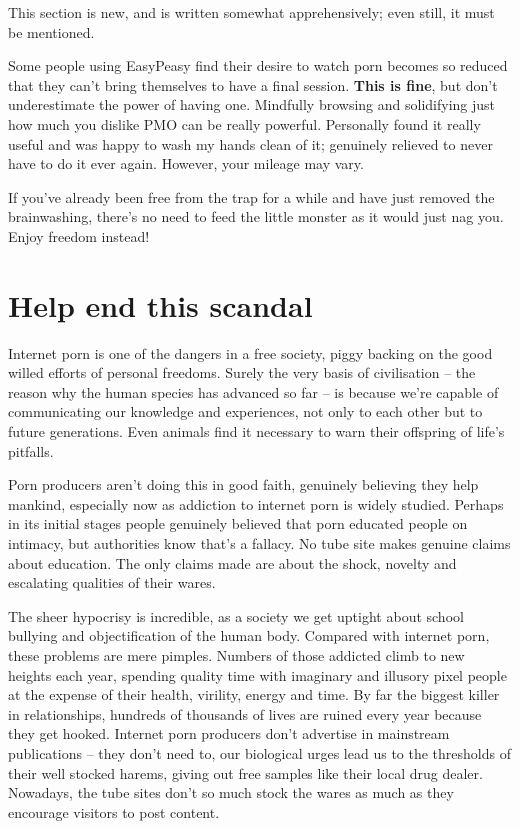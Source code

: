 \documentclass[
]{book}
\begin{document}
This section is new, and is written somewhat apprehensively; even still, it must be mentioned.

Some people using EasyPeasy find their desire to watch porn becomes so reduced that they can't bring themselves to have a final session. \textbf{This is fine}, but don't underestimate the power of having one. Mindfully browsing and solidifying just how much you dislike PMO can be really powerful. Personally found it really useful and was happy to wash my hands clean of it; genuinely relieved to never have to do it ever again. However, your mileage may vary.

If you've already been free from the trap for a while and have just removed the brainwashing, there's no need to feed the little monster as it would just nag you. Enjoy freedom instead!

\hypertarget{help-end-this-scandal}{%
\section{Help end this scandal}\label{help-end-this-scandal}}

Internet porn is one of the dangers in a free society, piggy backing on the good willed efforts of personal freedoms. Surely the very basis of civilisation -- the reason why the human species has advanced so far -- is because we're capable of communicating our knowledge and experiences, not only to each other but to future generations. Even animals find it necessary to warn their offspring of life's pitfalls.

Porn producers aren't doing this in good faith, genuinely believing they help mankind, especially now as addiction to internet porn is widely studied. Perhaps in its initial stages people genuinely believed that porn educated people on intimacy, but authorities know that's a fallacy. No tube site makes genuine claims about education. The only claims made are about the shock, novelty and escalating qualities of their wares.

The sheer hypocrisy is incredible, as a society we get uptight about school bullying and objectification of the human body. Compared with internet porn, these problems are mere pimples. Numbers of those addicted climb to new heights each year, spending quality time with imaginary and illusory pixel people at the expense of their health, virility, energy and time. By far the biggest killer in relationships, hundreds of thousands of lives are ruined every year because they get hooked. Internet porn producers don't advertise in mainstream publications -- they don't need to, our biological urges lead us to the thresholds of their well stocked harems, giving out free samples like their local drug dealer. Nowadays, the tube sites don't so much stock the wares as much as they encourage visitors to post content.
\end{document}
